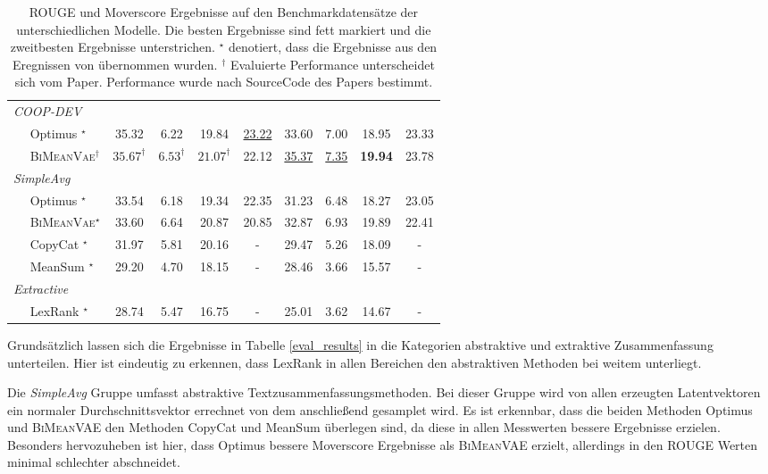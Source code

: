 \begin{table}[!h]
\begin{tabular}{@{}lcccccccc@{}}
    \textit{COOP-DEV}              &         &         &        &        &        & &   &    \\
    $\quad$ Optimus $^{\star}$           & 35.32   & 6.22    & 19.84 & \underline{23.22} & 33.60  & 7.00   & 18.95 & 23.33\\ 
    $\quad$ \textsc{BiMeanVae}$^{\dagger}$  & $\text{35.67}^{\dagger}$    & $\text{6.53}^{\dagger}$   & \underline{$\text{21.07}^{\dagger}$} & 22.12 & \underline{35.37}  & \underline{7.35}  & \textbf{19.94} & 23.78\\ \midrule
    

    \textit{SimpleAvg}         &         &         &        &      &  &        &        \\
    $\quad$ Optimus  $^{\star}$          & 33.54   & 6.18    & 19.34 & 22.35& 31.23  & 6.48   & 18.27 & 23.05\\
    $\quad$ \textsc{BiMeanVae}$^{\star}$ & 33.60   & 6.64    & 20.87 & 20.85& 32.87  & 6.93   & 19.89 & 22.41\\
    $\quad$ CopyCat  $^{\star}$          & 31.97   & 5.81    & 20.16 &- & 29.47  & 5.26   & 18.09 & -\\ 
    $\quad$ MeanSum  $^{\star}$          & 29.20   & 4.70    & 18.15 & -& 28.46  & 3.66   & 15.57 & -\\ \midrule
    \textit{Extractive}        &         &         &        &      &  &        &  &      \\
    $\quad$ LexRank  $^{\star}$          & 28.74   & 5.47    & 16.75 & -& 25.01  & 3.62   & 14.67 & -\\ \bottomrule
    \end{tabular}
    \caption{ROUGE und Moverscore Ergebnisse auf den Benchmarkdatensätze der unterschiedlichen Modelle. Die besten Ergebnisse sind fett markiert und die zweitbesten Ergebnisse unterstrichen.
    $^{\star}$ denotiert, dass die Ergebnisse aus den Eregnissen von \citep{coop} übernommen wurden.
    $^{\dagger}$ Evaluierte Performance unterscheidet sich vom \citep{coop} Paper. Performance wurde nach SourceCode des Papers bestimmt.
    }
\end{table}

Grundsätzlich lassen sich die Ergebnisse in Tabelle \ref{eval_results} in die Kategorien abstraktive und extraktive Zusammenfassung unterteilen.
Hier ist eindeutig zu erkennen, dass LexRank in allen Bereichen den abstraktiven Methoden bei weitem unterliegt.

Die \textit{SimpleAvg} Gruppe umfasst abstraktive Textzusammenfassungsmethoden. 
Bei dieser Gruppe wird von allen erzeugten Latentvektoren ein normaler Durchschnittsvektor errechnet von dem anschließend gesamplet wird.
Es ist erkennbar, dass die beiden Methoden Optimus und \textsc{BiMeanVAE} den Methoden CopyCat und MeanSum überlegen sind, da diese in allen Messwerten bessere Ergebnisse erzielen.
Besonders hervozuheben ist hier, dass Optimus bessere Moverscore Ergebnisse als \textsc{BiMeanVAE} erzielt, allerdings in den ROUGE Werten minimal schlechter abschneidet.

